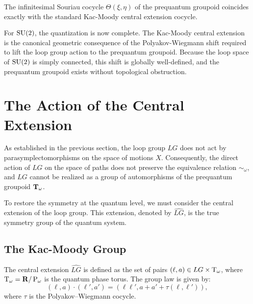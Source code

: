 \documentclass[11pt,reqno,letterpaper,twoside]{amsart}
\renewcommand{\TT}{\Groupoid{T}}
\begin{document}
  \begin{theorem}
    The infinitesimal Souriau cocycle $\Theta(\xi, \eta)$ of the prequantum groupoid coincides exactly with the standard Kac-Moody central extension cocycle.
  \end{theorem}
  
  For $\mathrm{SU}(2)$,
  the quantization is now complete.
  The Kac-Moody central extension is the canonical geometric consequence of the Polyakov-Wiegmann shift required to lift the loop group action to the prequantum groupoid.
  Because the loop space of $\mathrm{SU}(2)$ is simply connected,
  this shift is globally well-defined,
  and the prequantum groupoid exists without topological obstruction.
  
  \section{The Action of the Central Extension}
  
  As established in the previous section,
  the loop group $LG$ does not act by parasymplectomorphisms on the space of motions $X$.
  Consequently,
  the direct action of $LG$ on the space of paths does not preserve the equivalence relation $\sim_\omega$,
  and $LG$ cannot be realized as a group of automorphisms of the prequantum groupoid $\TT_\omega$.
  
  To restore the symmetry at the quantum level,
  we must consider the central extension of the loop group.
  This extension,
  denoted by $\widehat{LG}$,
  is the true symmetry group of the quantum system.
  
  \subsection{The Kac-Moody Group}
  The central extension $\widehat{LG}$ is defined as the set of pairs $(\ell, a) \in LG \times \mathrm{T}_\omega$,
  where $\mathrm{T}_\omega = {\mathbf{R}}/\operatorname{P}_\omega$ is the quantum phase torus.
  The group law is given by:
  \[
    (\ell, a) \cdot (\ell', a') = (\ell \ell', a + a' + \tau(\ell, \ell')),
    \]
  where $\tau$ is the Polyakov--Wiegmann cocycle.
  
\end{document}
